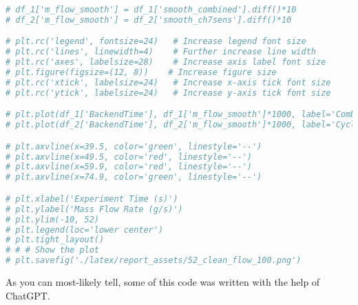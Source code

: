 \begin{lstlisting}[language=Python, caption={Example Python code for Mass Flow Analysis}]
# df_1['m_flow_smooth'] = df_1['smooth_combined'].diff()*10
# df_2['m_flow_smooth'] = df_2['smooth_ch7sens'].diff()*10

# plt.rc('legend', fontsize=24)   # Increase legend font size
# plt.rc('lines', linewidth=4)    # Further increase line width
# plt.rc('axes', labelsize=28)    # Increase axis label font size
# plt.figure(figsize=(12, 8))    # Increase figure size
# plt.rc('xtick', labelsize=24)   # Increase x-axis tick font size
# plt.rc('ytick', labelsize=24)   # Increase y-axis tick font size

# plt.plot(df_1['BackendTime'], df_1['m_flow_smooth']*1000, label='Combined Tank', color='purple')
# plt.plot(df_2['BackendTime'], df_2['m_flow_smooth']*1000, label='Cyclone Seperator', color='orange')

# plt.axvline(x=39.5, color='green', linestyle='--')
# plt.axvline(x=49.5, color='red', linestyle='--')
# plt.axvline(x=59.9, color='red', linestyle='--')
# plt.axvline(x=74.9, color='green', linestyle='--')

# plt.xlabel('Experiment Time (s)')
# plt.ylabel('Mass Flow Rate (g/s)')
# plt.ylim(-10, 52)
# plt.legend(loc='lower center')
# plt.tight_layout()
# # # Show the plot
# plt.savefig('./latex/report_assets/52_clean_flow_100.png')

\end{lstlisting}

As you can most-likely tell, some of this code was written with the help of ChatGPT.\@